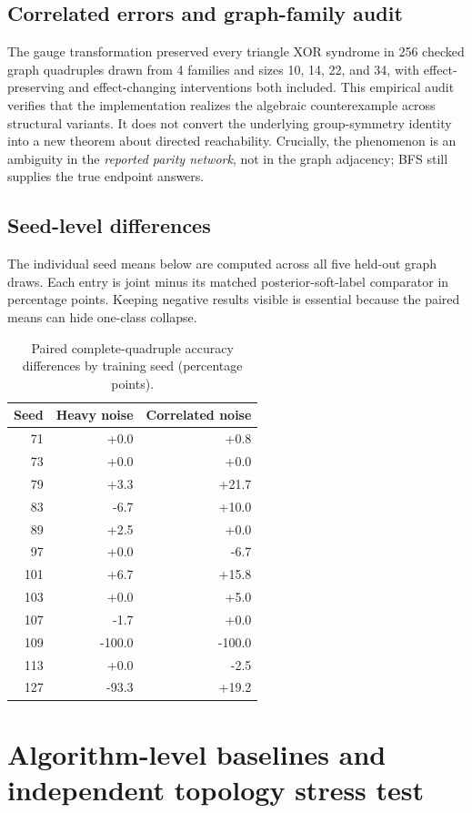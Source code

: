 \documentclass[10pt]{article}
\begin{document}
\subsection{Correlated errors and graph-family audit}
The gauge transformation preserved every triangle XOR syndrome in 256 checked graph quadruples drawn from 4 families and sizes 10, 14, 22, and 34, with effect-preserving and effect-changing interventions both included. This empirical audit verifies that the implementation realizes the algebraic counterexample across structural variants. It does not convert the underlying group-symmetry identity into a new theorem about directed reachability. Crucially, the phenomenon is an ambiguity in the \emph{reported parity network}, not in the graph adjacency; BFS still supplies the true endpoint answers.

\subsection{Seed-level differences}
The individual seed means below are computed across all five held-out graph draws. Each entry is joint minus its matched posterior-soft-label comparator in percentage points. Keeping negative results visible is essential because the paired means can hide one-class collapse.
\begin{table}[h]
\centering\small
\caption{Paired complete-quadruple accuracy differences by training seed (percentage points).}
\begin{tabular}{rrr}\toprule
Seed & Heavy noise & Correlated noise\\ \midrule
71 & +0.0 & +0.8 \\
73 & +0.0 & +0.0 \\
79 & +3.3 & +21.7 \\
83 & -6.7 & +10.0 \\
89 & +2.5 & +0.0 \\
97 & +0.0 & -6.7 \\
101 & +6.7 & +15.8 \\
103 & +0.0 & +5.0 \\
107 & -1.7 & +0.0 \\
109 & -100.0 & -100.0 \\
113 & +0.0 & -2.5 \\
127 & -93.3 & +19.2 \\
\bottomrule\end{tabular}
\end{table}


\section{Algorithm-level baselines and independent topology stress test}
\label{sec:published}
\end{document}
